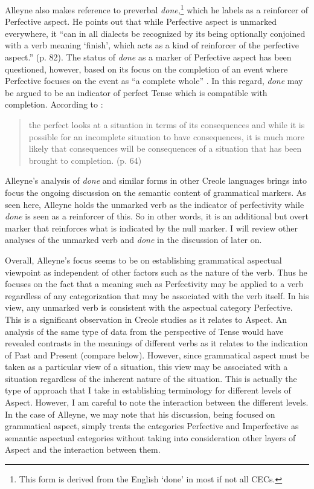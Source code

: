 Alleyne also makes reference to preverbal \textit{done},\footnote{This
  form is derived from the English `done' in most if not all CECs.}
which he labels as a reinforcer of Perfective aspect.  He points out
that while Perfective aspect is unmarked everywhere, it “can in all
dialects be recognized by its being optionally conjoined with a verb
meaning `finish',  which acts as a kind of reinforcer of the perfective
aspect.” (p. 82).  The status of \textit{done} as a marker of
Perfective aspect has been questioned, however, based on its focus on
the completion of an event where Perfective focuses on the event as “a
complete whole” \citep{Comrie1976}.  In this regard, \textit{done} may
be argued to be an indicator of perfect Tense which is compatible with
completion.  According to \citet{Comrie1976}:

\begin{quote}
the perfect looks at a situation in terms of its consequences and
while it is possible for an incomplete situation to have consequences,
it is much more likely that consequences will be consequences of a
situation that has been brought to completion. (p. 64)
\end{quote}

Alleyne’s analysis of \textit{done} and similar forms in other Creole
languages brings into focus the ongoing discussion on the semantic
content of grammatical markers.  As seen here, Alleyne holds the
unmarked verb as the indicator of perfectivity while \textit{done} is
seen as a reinforcer of this.  So in other words, it is an additional but
overt marker that reinforces what is indicated by the null marker.  I
will review other analyses of the unmarked verb and \textit{done} in
the discussion of \citet{Youssef2003} later on.

Overall, Alleyne’s focus seems to be on establishing grammatical
aspectual viewpoint as independent of other factors such as the nature
of the verb. Thus he focuses on the fact that a meaning such as
Perfectivity may be applied to a verb regardless of any categorization
that may be associated with the verb itself.  In his view, any
unmarked verb is consistent with the aspectual category Perfective.
This is a significant observation in Creole studies as it relates to
Aspect.  An analysis of the same type of data from the perspective of
Tense would have revealed contrasts in the meanings of different verbs
as it relates to the indication of Past and Present (compare
\citealt{Bickerton1975} below).  However, since grammatical aspect must be
taken as a particular view of a situation, this view may be associated
with a situation regardless of the inherent nature of the
situation. This is actually the type of approach that I take in
establishing terminology for different levels of Aspect.  However, I
am careful to note the interaction between the different levels.  In
the case of Alleyne, we may note that his discussion, being focused on
grammatical aspect, simply treats the categories Perfective and
Imperfective as semantic aspectual categories without taking into
consideration other layers of Aspect and the interaction between them.

